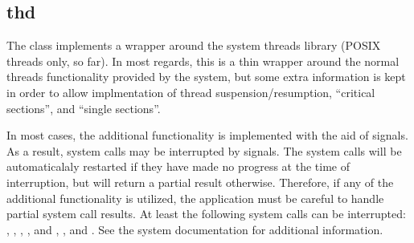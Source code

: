 %
%
%
%
%              

\subsection{thd}
\label{thd}

The  class implements a wrapper around the system threads library
(POSIX threads only, so far).  In most regards, this is a thin wrapper around
the normal threads functionality provided by the system, but some extra
information is kept in order to allow implmentation of thread
suspension/resumption, ``critical sections'', and ``single sections''.

In most cases, the additional functionality is implemented with the aid of
signals.  As a result, system calls may be interrupted by signals.  The system
calls will be automaticalaly restarted if they have made no progress at the time
of interruption, but will return a partial result otherwise.  Therefore, if any
of the additional functionality is utilized, the application must be careful to
handle partial system call results.  At least the following system calls can be
interrupted: , , ,
,  and , ,
and .  See the system documentation for additional information.

